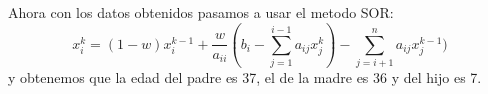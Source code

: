 \begin{frame}

    \begin{solution}
      Ahora con los datos obtenidos pasamos a usar el metodo SOR:
      \begin{equation*}
          x_{i}^{k}=(1-w)x_{i}^{k-1}+\frac{w}{a_{ii}}(b_{i}-\sum\limits_{j=1}^{i-1}a_{ij}x_{j}^{k}) -\sum\limits_{j=i+1}^{n}a_{ij}x_{j}^{k-1})
      \end{equation*}
      y obtenemos que la edad del padre es 37, el de la madre es 36 y del hijo es 7.
    \end{solution}
    
\end{frame}

\begin{frame}
    
\end{frame}